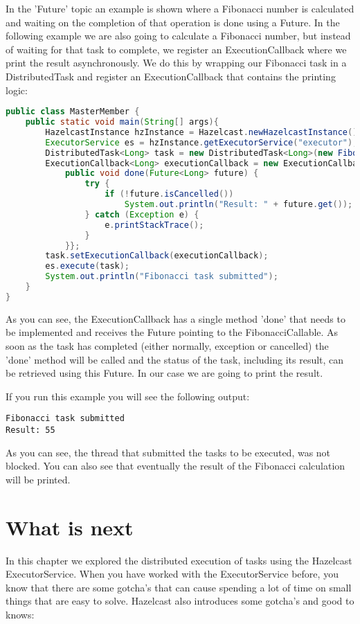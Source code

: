 In the 'Future' topic an example is shown where a Fibonacci number is calculated and waiting on the completion of that operation is done using a Future. In the following example we are also going to calculate a Fibonacci number, but instead of waiting for that task to complete, we register an ExecutionCallback where we print the result asynchronously. We do this by wrapping our Fibonacci task in a DistributedTask and register an ExecutionCallback that contains the printing logic:
\begin{lstlisting}[language=java]
public class MasterMember {
    public static void main(String[] args){
        HazelcastInstance hzInstance = Hazelcast.newHazelcastInstance();
        ExecutorService es = hzInstance.getExecutorService("executor");
        DistributedTask<Long> task = new DistributedTask<Long>(new FibonacciCallable(10));
        ExecutionCallback<Long> executionCallback = new ExecutionCallback<Long>() {
            public void done(Future<Long> future) {
                try {
                    if (!future.isCancelled()) 
                        System.out.println("Result: " + future.get());
                } catch (Exception e) {
                    e.printStackTrace();
                }
            }};
        task.setExecutionCallback(executionCallback);
        es.execute(task);
        System.out.println("Fibonacci task submitted");
    }
}
\end{lstlisting}
As you can see, the ExecutionCallback has a single method 'done' that needs to be implemented and receives the Future pointing to the FibonacciCallable. As soon as the task has completed (either normally, exception or cancelled) the 'done' method will be called and the status of the task, including its result, can be retrieved using this Future. In our case we are going to print the result.

If you run this example you will see the following output:
\begin{lstlisting}
Fibonacci task submitted
Result: 55
\end{lstlisting}
As you can see, the thread that submitted the tasks to be executed, was not blocked. You can also see that eventually the result of the Fibonacci calculation will be printed. 

\section{What is next}
In this chapter we explored the distributed execution of tasks using the Hazelcast ExecutorService. When you have worked with the ExecutorService before, you know that there are some gotcha's that can cause spending a lot of time on small things that are easy to solve. Hazelcast also introduces some gotcha's and good to knows:

